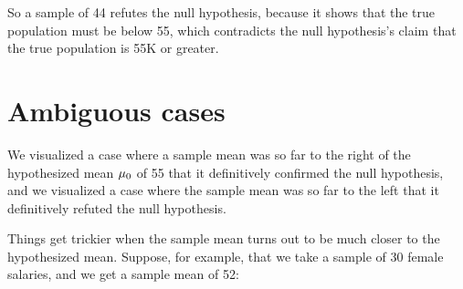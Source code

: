 \documentclass[../../../main.tex]{subfiles}
\begin{document}
\begin{center}
\end{center}

\noindent
So a sample of 44 refutes the null hypothesis, because it shows that the true population must be below 55, which contradicts the null hypothesis's claim that the true population is 55K or greater.


\section{Ambiguous cases}

We visualized a case where a sample mean was so far to the right of the hypothesized mean $\HypPopMean/$ of 55 that it definitively confirmed the null hypothesis, and we visualized a case where the sample mean was so far to the left that it definitively refuted the null hypothesis. 

Things get trickier when the sample mean turns out to be much closer to the hypothesized mean. Suppose, for example, that we take a sample of 30 female salaries, and we get a sample mean of 52:
\end{document}
